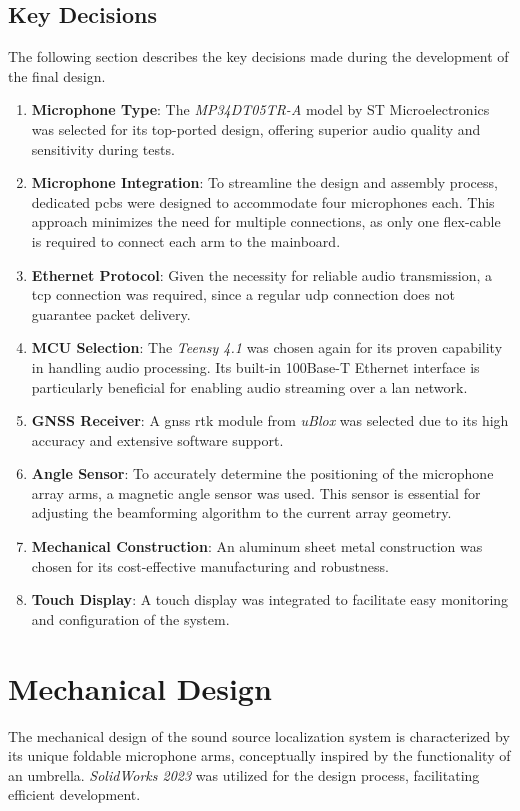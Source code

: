 \subsection{Key Decisions}
The following section describes the key decisions made during the development of the final design.
\begin{enumerate}
	\item \textbf{Microphone Type}: The \textit{MP34DT05TR-A} model by ST Microelectronics was selected for its top-ported design, offering superior audio quality and sensitivity during tests.
	\item \textbf{Microphone Integration}: To streamline the design and assembly process, dedicated \acrshort{pcb}s were designed to accommodate four microphones each.
	      This approach minimizes the need for multiple connections, as only one flex-cable is required to connect each arm to the mainboard.
	\item \textbf{Ethernet Protocol}: Given the necessity for reliable audio transmission, a \acrshort{tcp} connection was required, since a regular \acrshort{udp} connection does not guarantee packet delivery.
	\item \textbf{MCU Selection}: The \textit{Teensy 4.1} was chosen again for its proven capability in handling audio processing.
	      Its built-in 100Base-T Ethernet interface is particularly beneficial for enabling audio streaming over a \acrshort{lan} network.
	\item \textbf{GNSS Receiver}: A \acrshort{gnss} \acrshort{rtk} module from \textit{uBlox} was selected due to its high accuracy and extensive software support.
	\item \textbf{Angle Sensor}: To accurately determine the positioning of the microphone array arms, a magnetic angle sensor was used.
	      This sensor is essential for adjusting the beamforming algorithm to the current array geometry.
	\item \textbf{Mechanical Construction}: An aluminum sheet metal construction was chosen for its cost-effective manufacturing and robustness.
	\item \textbf{Touch Display}: A touch display was integrated to facilitate easy monitoring and configuration of the system.
\end{enumerate}
\newpage

\section{Mechanical Design}
\label{chap:fin:Mech}
The mechanical design of the sound source localization system is characterized by its unique foldable microphone arms, conceptually inspired by the functionality of an umbrella.
\textit{SolidWorks 2023} was utilized for the design process, facilitating efficient development.

